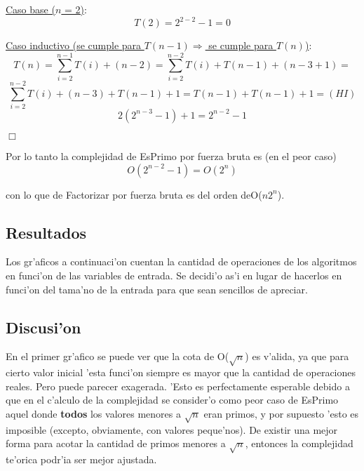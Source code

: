 \underline{Caso base ($n$ = 2)}:
$$T(2) = 2^{2-2} - 1 = 0$$

\underline{Caso inductivo (se cumple para $T(n-1) \Longrightarrow$ se cumple para $T(n)$)}:
$$T(n) = \sum_{i=2}^{n-1}{T(i)} + (n-2) = \sum_{i=2}^{n-2}{T(i)} + T(n-1) + (n-3+1) =$$
$$\sum_{i=2}^{n-2}{T(i)} + (n-3) + T(n-1) + 1 = T(n-1) + T(n-1) + 1 =  (HI)$$
$$2(2^{n-3} - 1) + 1 = 2^{n-2} - 1 $$
\begin{flushright}
$\Box$   
\end{flushright}

Por lo tanto la complejidad de EsPrimo por fuerza bruta es (en el peor caso)
$$O(2^{n-2}-1) = O(2^n)$$

con lo que de Factorizar por fuerza bruta es del orden deO($n2^n$).



\clearpage
\subsection{Resultados}
Los gr'aficos a continuaci'on cuentan la cantidad de operaciones de los algoritmos en funci'on de las variables de entrada. Se decidi'o as'i en lugar de hacerlos en funci'on del tama'no de la entrada para que sean sencillos de apreciar.

\clearpage


\subsection{Discusi'on}
En el primer gr'afico se puede ver que la cota de O($\sqrt{n}$) es v'alida, ya que para cierto valor inicial 'esta funci'on siempre es mayor que la cantidad de operaciones reales. Pero puede parecer exagerada. 'Esto es perfectamente esperable debido a que en el c'alculo de la complejidad se consider'o como peor caso de EsPrimo aquel donde {\bf todos} los valores menores a $\sqrt{n}$ eran primos, y por supuesto 'esto es imposible (excepto, obviamente, con valores peque'nos). De existir una mejor forma para acotar la cantidad de primos menores a $\sqrt{n}$, entonces la complejidad te'orica podr'ia ser mejor ajustada.

